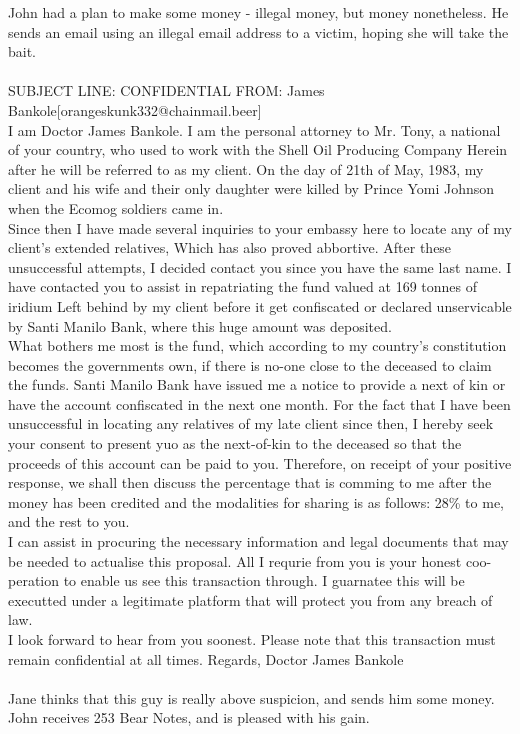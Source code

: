 \documentclass{article}
\begin{document}
John had a plan to make some money {-} illegal money, but money nonetheless.
He sends an email using an illegal email address to a victim, hoping she will take the bait.
\\\\
SUBJECT LINE: CONFIDENTIAL
FROM: James Bankole[orangeskunk332@chainmail.beer]
\\
I am Doctor James Bankole.
I am the personal attorney to Mr. Tony, a national of your country, who used to work with the Shell Oil Producing Company
Herein after he will be referred to as my client.
On the day of 21th of May, 1983, my client and his wife and their only daughter were killed by Prince Yomi Johnson when the Ecomog soldiers came in.
\\
Since then I have made several inquiries to your embassy here to locate any of my client's extended relatives, Which has also proved abbortive.
After these unsuccessful attempts, I decided contact you since you have the same last name.
I have contacted you to assist in repatriating the fund valued at 169 tonnes of iridium Left behind by my client before it get confiscated or declared unservicable by Santi Manilo Bank, where this huge amount was deposited.
\\
What bothers me most is the fund, which according to my country's constitution becomes the governments own, if there is no{-}one close to the deceased to claim the funds.
Santi Manilo Bank have issued me a notice to provide a next of kin or have the account confiscated in the next one month.
For the fact that I have been unsuccessful in locating any relatives of my late client since then, I hereby seek your consent to present yuo as the next{-}of{-}kin to the deceased so that the proceeds of this account can be paid to you.
Therefore, on receipt of your positive response, we shall then discuss the percentage that is comming to me after the money has been credited and the modalities for sharing is as follows: 28\% to me, and the rest to you.
\\
I can assist in procuring the necessary information and legal documents that may be needed to actualise this proposal.
All I requrie from you is your honest coo{-}peration to enable us see this transaction through.
I guarnatee this will be executted under a legitimate platform that will protect you from any breach of law.
\\
I look forward to hear from you soonest.
Please note that this transaction must remain confidential at all times.
Regards, Doctor James Bankole
\\\\
Jane thinks that this guy is really above suspicion, and sends him some money.
John receives 253 Bear Notes, and is pleased with his gain.
\end{document}
